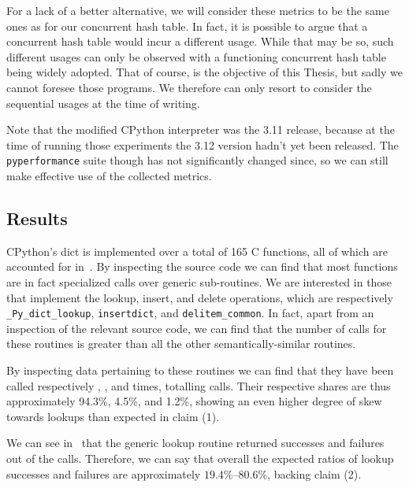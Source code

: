 For a lack of a better alternative, we will consider these metrics to be the same ones as for our concurrent hash table.
In fact, it is possible to argue that a concurrent hash table would incur a different usage.
While that may be so, such different usages can only be observed with a functioning concurrent hash table being widely adopted.
That of course, is the objective of this Thesis, but sadly we cannot foresee those programs.
We therefore can only resort to consider the sequential usages at the time of writing.

Note that the modified CPython interpreter was the 3.11 release, because at the time of running those experiments the 3.12 version hadn't yet been released.
The \texttt{pyperformance} suite though has not significantly changed since, so we can still make effective use of the collected metrics.

\subsection{Results}\label{subsec:dict-metrics-results}

CPython's dict is implemented over a total of 165 C functions, all of which are accounted for in~\cite{dict-metrics}.
By inspecting the source code we can find that most functions are in fact specialized calls over generic sub-routines.
We are interested in those that implement the lookup, insert, and delete operations, which are respectively \texttt{\_Py\_dict\_lookup}, \texttt{insertdict}, and \texttt{delitem\_common}.
In fact, apart from an inspection of the relevant source code, we can find that the number of calls for these routines is greater than all the other semantically-similar routines.

By inspecting data pertaining to these routines we can find that they have been called respectively , , and  times, totalling  calls.
Their respective shares are thus approximately 94.3\%, 4.5\%, and 1.2\%, showing an even higher degree of skew towards lookups than expected in claim (1).

We can see in~\cite{dict-metrics} that the generic lookup routine returned  successes and  failures out of the  calls.
Therefore, we can say that overall the expected ratios of lookup successes and failures are approximately ${19.4}\%$--${80.6}\%$, backing claim (2).
